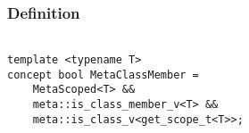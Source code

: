 
\subsubsection{Definition}

\begin{verbatim}

template <typename T>
concept bool MetaClassMember =
	MetaScoped<T> &&
	meta::is_class_member_v<T> &&
	meta::is_class_v<get_scope_t<T>>;

\end{verbatim}

